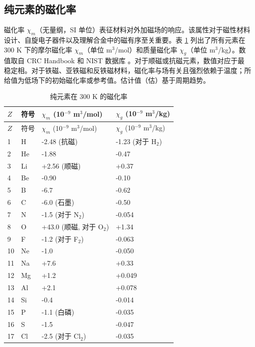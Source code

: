 \documentclass[12pt,a4paper]{article}
\begin{document}
	\subsection{纯元素的磁化率}
	\label{subsec:magnetic-susceptibility}
	
	磁化率 \(\chi_m\)（无量纲，SI 单位）表征材料对外加磁场的响应。该属性对于磁性材料设计、自旋电子器件以及理解合金中的磁有序至关重要。表 \ref{tab:magnetic-susceptibility-all} 列出了所有元素在 300 K 下的摩尔磁化率 \(\chi_m\)（单位 m\(^3\)/mol）和质量磁化率 \(\chi_g\)（单位 m\(^3\)/kg）。数值取自 CRC Handbook \cite{CRC} 和 NIST 数据库 \cite{NIST}。对于顺磁或抗磁元素，数值对应于最稳定相。对于铁磁、亚铁磁和反铁磁材料，磁化率与场有关且强烈依赖于温度；所给值为低场下的初始磁化率或参考值。估计值（估）基于周期趋势。
	
	\begin{longtable}{p{0.6cm}p{1.2cm}p{2.5cm}p{2.5cm}}
		\caption{纯元素在 300 K 的磁化率} \label{tab:magnetic-susceptibility-all} \\
		\toprule
		\(Z\) & 符号 & \(\chi_m\) (10\(^{-9}\) m\(^3\)/mol) & \(\chi_g\) (10\(^{-9}\) m\(^3\)/kg) \\
		\midrule
		\endfirsthead
		\toprule
		\(Z\) & 符号 & \(\chi_m\) (10\(^{-9}\) m\(^3\)/mol) & \(\chi_g\) (10\(^{-9}\) m\(^3\)/kg) \\
		\midrule
		\endhead
		1  & H  & -2.48 (抗磁) & -1.23 (对于 H\(_2\)) \\
		2  & He & -1.88 & -0.47 \\
		3  & Li & +2.56 (顺磁) & +0.37 \\
		4  & Be & -0.90 & -0.10 \\
		5  & B  & -6.7 & -0.62 \\
		6  & C  & -6.0 (石墨) & -0.50 \\
		7  & N  & -1.5 (对于 N\(_2\)) & -0.054 \\
		8  & O  & +43.0 (顺磁, 对于 O\(_2\)) & +1.34 \\
		9  & F  & -1.2 (对于 F\(_2\)) & -0.063 \\
		10 & Ne & -1.0 & -0.050 \\
		11 & Na & +7.6 & +0.33 \\
		12 & Mg & +1.2 & +0.049 \\
		13 & Al & +2.1 & +0.078 \\
		14 & Si & -0.4 & -0.014 \\
		15 & P  & -1.1 (白磷) & -0.035 \\
		16 & S  & -1.5 & -0.047 \\
		17 & Cl & -2.5 (对于 Cl\(_2\)) & -0.035 \\

\end{longtable}
\end{document}

